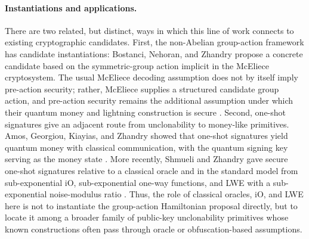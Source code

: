 \documentclass[12pt]{article}
\begin{document}
\paragraph{Instantiations and applications.}
There are two related, but distinct, ways in which this line of work connects to existing cryptographic candidates.
First, the non-Abelian group-action framework has candidate instantiations: Bostanci, Nehoran, and Zhandry propose a concrete candidate based on the symmetric-group action implicit in the McEliece cryptosystem.
The usual McEliece decoding assumption does not by itself imply pre-action security; rather, McEliece supplies a structured candidate group action, and pre-action security remains the additional assumption under which their quantum money and lightning construction is secure \cite{bostanciGeneralQuantumDuality2025}.
Second, one-shot signatures give an adjacent route from unclonability to money-like primitives.
Amos, Georgiou, Kiayias, and Zhandry showed that one-shot signatures yield quantum money with classical communication, with the quantum signing key serving as the money state \cite{amosOneShotSignaturesApplications2020}.
More recently, Shmueli and Zhandry gave secure one-shot signatures relative to a classical oracle and in the standard model from sub-exponential iO, sub-exponential one-way functions, and LWE with a sub-exponential noise-modulus ratio \cite{shmueliOneShotSignaturesQuantum2025a}.
Thus, the role of classical oracles, iO, and LWE here is not to instantiate the group-action Hamiltonian proposal directly, but to locate it among a broader family of public-key unclonability primitives whose known constructions often pass through oracle or obfuscation-based assumptions.
\begin{singlespace}
\printbibliography
\end{singlespace}
\end{document}

